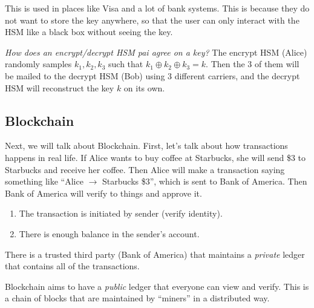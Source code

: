 This is used in places like Visa and a lot of bank systems. This is because they do not want to store the key anywhere, so that the user can only interact with the HSM like a black box without seeing the key.

\textit{How does an encrypt/decrypt HSM pai agree on a key?} The encrypt HSM (Alice) randomly samples $k_1, k_2, k_3$ such that $k_1 \oplus k_2 \oplus k_3 = k$. Then the 3 of them will be mailed to the decrypt HSM (Bob) using 3 different carriers, and the decrypt HSM will reconstruct the key $k$ on its own.

\subsection{Blockchain}

Next, we will talk about Blockchain. First, let's talk about how transactions happens in real life. If Alice wants to buy coffee at Starbucks, she will send \$3 to Starbucks and receive her coffee. Then Alice will make a transaction saying something like ``Alice $\to$ Starbucks \$3'', which is sent to Bank of America. Then Bank of America will verify to things and approve it.

\begin{enumerate}
    \item The transaction is initiated by sender (verify identity).
    \item There is enough balance in the sender's account.
\end{enumerate}

There is a trusted third party (Bank of America) that maintains a \textit{private} ledger that contains all of the transactions.

\begin{center}
\end{center}

Blockchain aims to have a \textit{public} ledger that everyone can view and verify. This is a chain of blocks that are maintained by ``miners'' in a distributed way.

